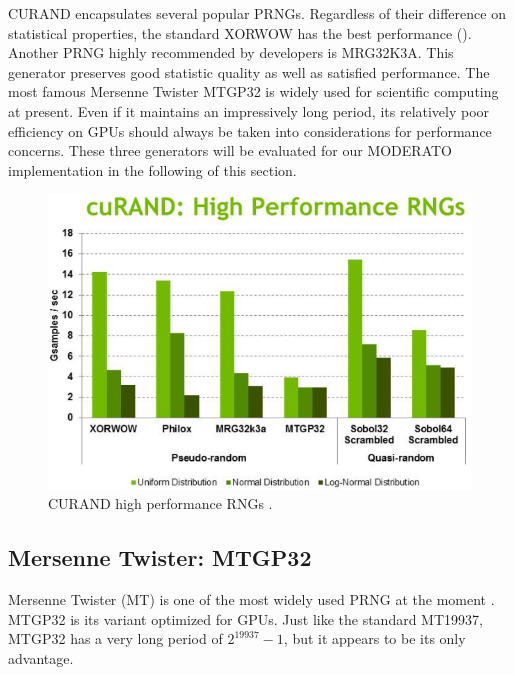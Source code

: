 CURAND encapsulates several popular PRNGs. Regardless of their difference on statistical properties, the standard XORWOW has the best performance (). Another PRNG highly recommended by developers is MRG32K3A. This generator preserves good statistic quality as well as satisfied performance. The most famous Mersenne Twister MTGP32 is widely used for scientific computing at present. Even if it maintains an impressively long period, its relatively poor efficiency on GPUs should always be taken into considerations for performance concerns. These three generators will be evaluated for our MODERATO implementation in the following of this section.
\vspace{1cm}
\begin{figure}[htbp]
	\centering
		\includegraphics[width=13cm]{Figures/curand2.png}
	\caption[CURAND high performance RNGs]{CURAND high performance RNGs \citep{cuda6report}.}%
	\label{fig:curand}
\end{figure}


\subsection{Mersenne Twister: MTGP32}
Mersenne Twister (MT) is one of the most widely used PRNG at the moment \citep{marsland2011machine}. MTGP32 is its variant optimized for GPUs. Just like the standard MT19937, MTGP32 has a very long period of $2^{19937}-1$, but it appears to be its only advantage.

